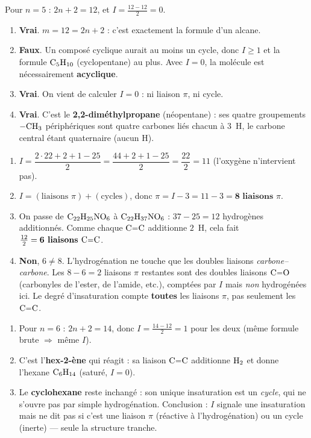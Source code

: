 \documentclass[11pt,a4paper]{article}
\begin{document}
\begin{corrige}
Pour $n=5$ : $2n+2=12$, et $I=\frac{12-12}{2}=0$.
\begin{enumerate}[label=\alph*)]
  \item \textbf{Vrai}. $m=12=2n+2$ : c'est exactement la formule d'un alcane.
  \item \textbf{Faux}. Un composé cyclique aurait au moins un cycle, donc $I\geq1$ et la formule $\ce{C5H10}$ (cyclopentane) au plus. Avec $I=0$, la molécule est nécessairement \textbf{acyclique}.
  \item \textbf{Vrai}. On vient de calculer $I=0$ : ni liaison $\pi$, ni cycle.
  \item \textbf{Vrai}. C'est le \textbf{2,2-diméthylpropane} (néopentane) : ses quatre groupements $\ce{-CH3}$ périphériques sont quatre carbones liés chacun à $3$~H, le carbone central étant quaternaire (aucun H).
\end{enumerate}
\end{corrige}

\begin{corrige}
\begin{enumerate}[label=\alph*)]
  \item $I=\dfrac{2\cdot22+2+1-25}{2}=\dfrac{44+2+1-25}{2}=\dfrac{22}{2}=11$ (l'oxygène n'intervient pas).
  \item $I=(\text{liaisons }\pi)+(\text{cycles})$, donc $\pi=I-3=11-3=\textbf{8 liaisons }\pi$.
  \item On passe de $\ce{C22H25NO6}$ à $\ce{C22H37NO6}$ : $37-25=12$ hydrogènes additionnés. Comme chaque $\ce{C=C}$ additionne $2$~H, cela fait $\frac{12}{2}=\textbf{6 liaisons }\ce{C=C}$.
  \item \textbf{Non}, $6\neq8$. L'hydrogénation ne touche que les doubles liaisons \emph{carbone--carbone}. Les $8-6=2$ liaisons $\pi$ restantes sont des doubles liaisons $\ce{C=O}$ (carbonyles de l'ester, de l'amide, etc.), comptées par $I$ mais \emph{non} hydrogénées ici. Le degré d'insaturation compte \textbf{toutes} les liaisons $\pi$, pas seulement les $\ce{C=C}$.
\end{enumerate}
\end{corrige}

\begin{corrige}
\begin{enumerate}[label=\alph*)]
  \item Pour $n=6$ : $2n+2=14$, donc $I=\frac{14-12}{2}=1$ pour les deux (même formule brute $\Rightarrow$ même $I$).
  \item C'est l'\textbf{hex-2-ène} qui réagit : sa liaison $\ce{C=C}$ additionne $\ce{H2}$ et donne l'hexane $\ce{C6H14}$ (saturé, $I=0$).
  \item Le \textbf{cyclohexane} reste inchangé : son unique insaturation est un \emph{cycle}, qui ne s'ouvre pas par simple hydrogénation. Conclusion : $I$ signale une insaturation mais ne dit pas si c'est une liaison $\pi$ (réactive à l'hydrogénation) ou un cycle (inerte) --- seule la structure tranche.
\end{enumerate}
\end{corrige}
\end{document}
